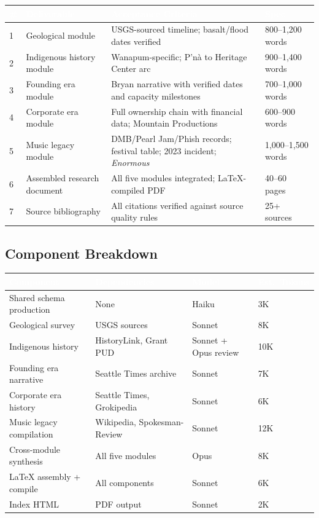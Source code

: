 \documentclass[11pt,letterpaper]{article}
\newcommand{\tableheader}[1]{\textbf{\sffamily\textcolor{white}{#1}}}
\begin{document}
\begin{center}
\begin{tabularx}{\textwidth}{C{0.4cm}L{3cm}XL{2.5cm}}
\toprule
{}
\tableheader{\#} & \tableheader{Deliverable} & \tableheader{Acceptance Criteria} & \tableheader{Spec} \\
 & Geological module & USGS-sourced timeline; basalt/flood dates verified & 800--1,200 words \\
2 & Indigenous history module & Wanapum-specific; P'n\`a to Heritage Center arc & 900--1,400 words \\
3 & Founding era module & Bryan narrative with verified dates and capacity milestones & 700--1,000 words \\
4 & Corporate era module & Full ownership chain with financial data; Mountain Productions & 600--900 words \\
5 & Music legacy module & DMB/Pearl Jam/Phish records; festival table; 2023 incident; \textit{Enormous} & 1,000--1,500 words \\
6 & Assembled research document & All five modules integrated; LaTeX-compiled PDF & 40--60 pages \\
7 & Source bibliography & All citations verified against source quality rules & 25+ sources \\
\bottomrule
\end{tabularx}
\end{center}

\subsection{Component Breakdown}

\begin{center}
\begin{tabularx}{\textwidth}{L{3cm}L{2.5cm}C{1.8cm}C{2cm}}
\toprule
{}
\tableheader{Component} & \tableheader{Dependencies} & \tableheader{Model} & \tableheader{Est.\ Tokens} \\
\midrule
Shared schema production & None & Haiku & 3K \\
Geological survey & USGS sources & Sonnet & 8K \\
Indigenous history & HistoryLink, Grant PUD & Sonnet + Opus review & 10K \\
Founding era narrative & Seattle Times archive & Sonnet & 7K \\
Corporate era history & Seattle Times, Grokipedia & Sonnet & 6K \\
Music legacy compilation & Wikipedia, Spokesman-Review & Sonnet & 12K \\
Cross-module synthesis & All five modules & Opus & 8K \\
LaTeX assembly + compile & All components & Sonnet & 6K \\
Index HTML & PDF output & Sonnet & 2K \\
\bottomrule
\end{tabularx}
\end{center}
\end{document}
